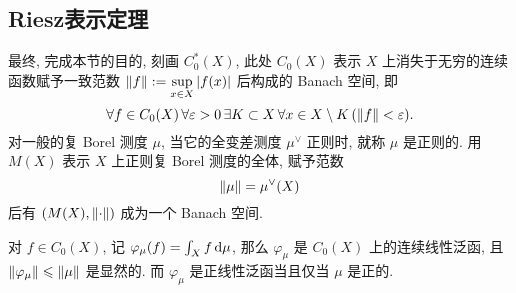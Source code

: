 	\subsection{Riesz表示定理}

	最终, 完成本节的目的, 刻画 $ C_0^*(X) $, 此处 $ C_0(X) $ 表示 $ X $ 上消失于无穷的连续函数赋予一致范数 $ \left\| f \right\|:=\sup\limits_{x\in X}\left| f(x) \right|  $ 后构成的 Banach 空间, 即
	\[
		\forall f\in C_0(X)\,\forall\varepsilon>0\,\exists K\subset X\,\forall x\in X\setminus K\,(\left\| f \right\|<\varepsilon).
	\]
	对一般的复 Borel 测度 $ \mu $, 当它的全变差测度 $ \mu^\lor $ 正则时, 就称 $ \mu $ 是正则的. 用 $ M(X) $ 表示 $ X $ 上正则复 Borel 测度的全体, 赋予范数
	\[
		\left\| \mu \right\|=\mu^\lor(X)
	\]
	后有 $ (M(X),\left\| \cdot \right\|) $ 成为一个 Banach 空间.

	对 $ f\in C_0(X) $, 记 $ \varphi_\mu(f)=\int_Xf\,\mathrm{d}\mu $, 那么 $ \varphi_\mu $ 是 $ C_0(X) $ 上的连续线性泛函, 且 $ \left\| \varphi_\mu \right\|\leqslant\left\| \mu \right\| $ 是显然的. 而 $ \varphi_\mu $ 是正线性泛函当且仅当 $ \mu $ 是正的.

